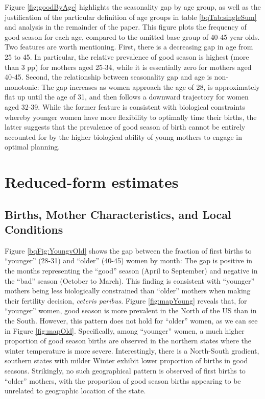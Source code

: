 \documentclass[a4paper, 12 pt]{article}
\theoremstyle{plain}
\begin{document}
\begin{doublespace}
Figure \ref{fig:goodByAge} highlights the seasonality gap by age group, as well as the justification of the particular definition of age groups in table \ref{bqTab:singleSum} and analysis in the remainder of the paper. This figure plots the frequency of good season for each age, compared to the omitted base group of 40-45 year olds.  Two features are worth mentioning. First, there is a decreasing gap in age from 25 to 45. In particular, the relative prevalence of good season is highest (more than 3 pp) for mothers aged 25-34, while it is essentially zero for mothers aged 40-45. Second, the relationship between seasonality gap and age is non-monotonic: The gap increases as women approach the age of 28, is approximately flat up until the age of 31, and then follows a downward trajectory for women aged 32-39. While the former feature is consistent with biological constraints whereby younger women have more flexibility to optimally time their births, the latter suggests that the prevalence of good season of birth cannot be entirely accounted for by the higher biological ability of young mothers to engage in optimal planning.


\section{Reduced-form estimates}
\label{scn:results}
\subsection{Births, Mother Characteristics, and Local Conditions}
  Figure \ref{bqFig:YoungvOld} shows the gap between the fraction of first births to ``younger'' (28-31) and ``older'' (40-45) women by month: The gap is positive in the months representing the ``good'' season (April to September) and negative in the ``bad'' season (October to March). This finding is consistent with ``younger'' mothers being less biologically constrained than ``older'' mothers when making their fertility decision, \emph{ceteris paribus}. Figure \ref{fig:mapYoung} reveals that, for ``younger'' women, good season is more prevalent in the North of the US than in the South. However, this pattern does not hold for ``older'' women, as we can see in Figure \ref{fig:mapOld}. Specifically, among ``younger'' women, a much higher proportion of good season births are observed in the northern states where the winter temperature is more severe. Interestingly, there is a North-South gradient, southern states with milder Winter exhibit lower proportion of births in good seasons. Strikingly, no such geographical pattern is observed of first births to ``older'' mothers, with the proportion of good season births appearing to be unrelated to geographic location of the state.


\end{doublespace}
\end{document}
